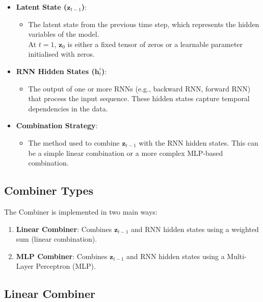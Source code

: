 \begin{itemize}
    \item \textbf{Latent State ($\bm{z}_{t-1}$)}:
        \begin{itemize}
            \item The latent state from the previous time step, which 
            represents the hidden variables of the model.\\
            At $t=1$, $\bm{z}_0$ is either a fixed tensor of zeros or a learnable
            parameter initialised with zeros.
        \end{itemize}
    \item \textbf{RNN Hidden States ($\bm{h}_{t}^{i}$)}:
        \begin{itemize}
            \item The output of one or more RNNs (e.g., backward RNN, 
            forward RNN) that process the input sequence. These hidden 
            states capture temporal dependencies in the data.
        \end{itemize}
    \item \textbf{Combination Strategy}:
        \begin{itemize}
            \item The method used to combine $\bm{z}_{t-1}$ with the RNN 
            hidden states. This can be a simple linear combination or 
            a more complex MLP-based combination.
        \end{itemize}
\end{itemize}

\subsection*{Combiner Types}

The Combiner is implemented in two main ways:
\begin{enumerate}
    \item \textbf{Linear Combiner}: Combines $\bm{z}_{t-1}$ and RNN hidden 
    states using a weighted sum (linear combination).
    \item \textbf{MLP Combiner}: Combines $\bm{z}_{t-1}$ and RNN hidden 
    states using a Multi-Layer Perceptron (MLP).
\end{enumerate}

\subsection{Linear Combiner}

